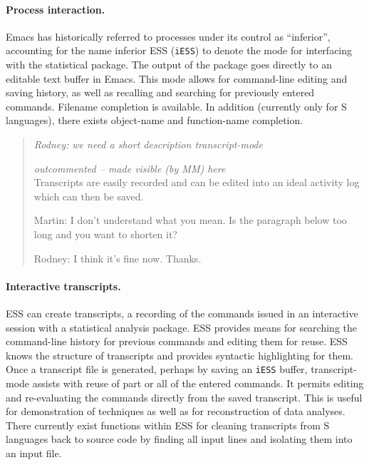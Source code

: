 \documentclass{article}
\newcommand{\stexttt}[1]{{\small\texttt{#1}}}
\newenvironment{Comment}{\begin{quote}\small\itshape }{\end{quote}}
\begin{document}
\paragraph{Process interaction.}
Emacs has historically referred to processes under its control as
``inferior'', accounting for the name inferior ESS (\stexttt{iESS}) to
denote the mode for interfacing with the statistical package.  The
output of the package goes directly to an editable text buffer in Emacs.
This mode allows for command-line editing and saving history, as well as
recalling and searching for previously entered commands.  Filename
completion is available.  In addition (currently only for S languages),
there exists object-name and function-name completion.

\begin{Comment}
 Rodney:  we need a short description transcript-mode

 \begin{trivlist}\item
   \emph{\small outcommented -- made visible (by MM) here}\\
   Transcripts are easily recorded and can be edited into an ideal activity
   log which can then be saved.
 \end{trivlist}

 Martin: I don't understand what you mean. Is the paragraph below too long
 and you want to shorten it?

 Rodney: I think it's fine now.  Thanks.
\end{Comment}

\paragraph{Interactive transcripts.}
ESS can create transcripts, a recording of the commands issued in an
interactive session with a statistical analysis package.
ESS provides means for searching
the command-line history for previous commands and editing them for
reuse.  ESS knows the structure of transcripts and provides
syntactic highlighting for them.
Once a transcript file is generated, perhaps by saving an \stexttt{iESS}
buffer, transcript-mode assists with reuse of part or all of the
entered commands.  It permits editing and re-evaluating the commands
directly from the saved transcript.  This is useful for
demonstration of techniques as well as for reconstruction of data
analyses.  There currently exist functions within ESS for cleaning
transcripts from S languages back to source code by finding all input
lines and isolating them into an input file.
\end{document}
